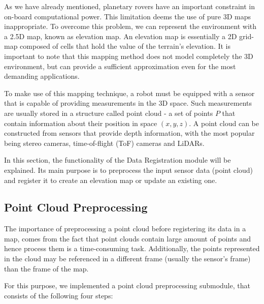 
As we have already mentioned, planetary rovers have an important constraint
in on-board computational power.
This limitation deems the use of pure 3D maps inappropriate.
To overcome this problem, we can represent the environment with a 2.5D map,
known as elevation map.
An elevation map is essentially a 2D grid-map composed of cells that hold
the value of the terrain's elevation.
It is important to note that this mapping method does not model completely
the 3D environment, but can provide a sufficient approximation even for
the most demanding applications.


To make use of this mapping technique, a robot must be equipped with a
sensor that is capable of providing measurements in the 3D space.
Such measurements are usually stored in a structure called point cloud -
a set of points $P$ that contain information about their position in
space $(x,y,z)$.
A point cloud can be constructed from sensors that provide depth information,
with the most popular being stereo cameras, time-of-flight (ToF) cameras
and LiDARs.


In this section, the functionality of the Data Registration module will be
explained.
Its main purpose is to preprocess the input sensor data (point cloud)
and register it to create an elevation map or update an existing one.

\subsection{Point Cloud Preprocessing} \label{point_cloud_processing}

The importance of preprocessing a point cloud before registering its data
in a map, comes from the fact that point clouds contain large amount of points
and hence process them is a time-consuming task.
Additionally, the points represented in the cloud may be referenced in a
different frame (usually the sensor's frame) than the frame of the map.

For this purpose, we implemented a point cloud preprocessing submodule,
that consists of the following four steps:


